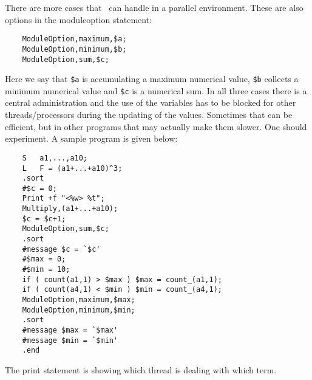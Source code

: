 There are more cases that \FORM\ can handle in a parallel environment. 
These are also options in the moduleoption statement:
\begin{verbatim}
    ModuleOption,maximum,$a;
    ModuleOption,minimum,$b;
    ModuleOption,sum,$c;
\end{verbatim}
Here we say that \verb:$a: is accumulating a maximum numerical value, 
\verb:$b: collects a minimum numerical value and \verb:$c: is a numerical 
sum. In all three cases there is a central administration and the use of 
the variables has to be blocked for other threads/processors during the 
updating of the values. Sometimes that can be efficient, but in other 
programs that may actually make them slower. One should experiment. A 
sample program is given below:
\begin{verbatim}
    S   a1,...,a10;
    L   F = (a1+...+a10)^3;
    .sort
    #$c = 0;
    Print +f "<%w> %t";
    Multiply,(a1+...+a10);
    $c = $c+1;
    ModuleOption,sum,$c;
    .sort
    #message $c = `$c'
    #$max = 0;
    #$min = 10;
    if ( count(a1,1) > $max ) $max = count_(a1,1);
    if ( count(a4,1) < $min ) $min = count_(a4,1);
    ModuleOption,maximum,$max;
    ModuleOption,minimum,$min;
    .sort
    #message $max = `$max'
    #message $min = `$min'
    .end
\end{verbatim}
The print statement is showing which thread is dealing with which term.

